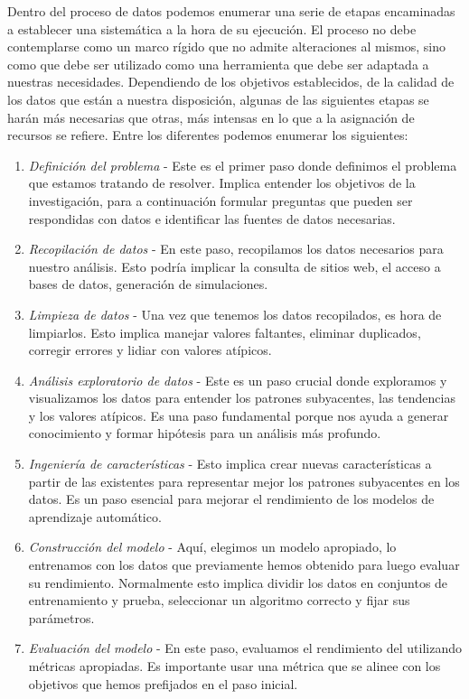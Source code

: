 Dentro del proceso de datos podemos enumerar una serie de etapas encaminadas a establecer una sistemática a la hora de su ejecución. El proceso no debe contemplarse como un marco rígido que no admite alteraciones al mismos, sino como que debe ser utilizado como una herramienta que debe ser adaptada a nuestras necesidades. Dependiendo de los objetivos establecidos, de la calidad de los datos que están a nuestra disposición, algunas de las siguientes etapas se harán más necesarias que otras, más intensas en lo que a la asignación de recursos se refiere. Entre los diferentes podemos enumerar los siguientes:
 
\begin{enumerate}
	\item \textit{Definición del problema} - Este es el primer paso donde definimos el problema que estamos tratando de resolver. Implica entender los objetivos de la investigación, para a continuación formular preguntas que pueden ser respondidas con datos e identificar las fuentes de datos necesarias.
	\item \textit{Recopilación de datos} - En este paso, recopilamos los datos necesarios para nuestro análisis. Esto podría implicar la consulta de sitios web, el acceso a bases de datos, generación de simulaciones.
	\item \textit{Limpieza de datos} - Una vez que tenemos los datos recopilados, es hora de limpiarlos. Esto implica manejar valores faltantes, eliminar duplicados, corregir errores y lidiar con valores atípicos.
	\item \textit{Análisis exploratorio de datos} - Este es un paso crucial donde exploramos y visualizamos los datos para entender los patrones subyacentes, las tendencias y los valores atípicos. Es una paso fundamental porque nos ayuda a generar conocimiento y formar hipótesis para un análisis más profundo.
	\item \textit{Ingeniería de características} - Esto implica crear nuevas características a partir de las existentes para representar mejor los patrones subyacentes en los datos. Es un paso esencial para mejorar el rendimiento de los modelos de aprendizaje automático. 
	\item \textit{Construcción del modelo} - Aquí, elegimos un modelo apropiado, lo entrenamos con los datos que previamente hemos obtenido para luego evaluar su rendimiento. Normalmente esto implica dividir los datos en conjuntos de entrenamiento y prueba, seleccionar un algoritmo correcto y fijar sus parámetros.
	\item \textit{Evaluación del modelo} - En este paso, evaluamos el rendimiento del utilizando métricas apropiadas. Es importante usar una métrica que se alinee con los objetivos que hemos prefijados en el paso inicial.

\end{enumerate}
